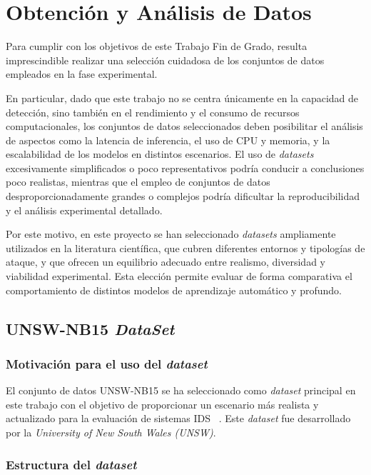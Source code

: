 \chapter{Obtención y Análisis de Datos}
\label{datasets}

Para cumplir con los objetivos de este Trabajo Fin de Grado, resulta imprescindible realizar una selección cuidadosa de los conjuntos de datos empleados en la fase experimental.

En particular, dado que este trabajo no se centra únicamente en la capacidad de detección, sino también en el rendimiento y el consumo de recursos computacionales, los conjuntos de datos seleccionados deben posibilitar el análisis de aspectos como la latencia de inferencia, el uso de CPU y memoria, y la escalabilidad de los modelos en distintos escenarios. El uso de \textit{datasets} excesivamente simplificados o poco representativos podría conducir a conclusiones poco realistas, mientras que el empleo de conjuntos de datos desproporcionadamente grandes o complejos podría dificultar la reproducibilidad y el análisis experimental detallado.

Por este motivo, en este proyecto se han seleccionado \textit{datasets} ampliamente utilizados en la literatura científica, que cubren diferentes entornos y tipologías de ataque, y que ofrecen un equilibrio adecuado entre realismo, diversidad y viabilidad experimental. Esta elección permite evaluar de forma comparativa el comportamiento de distintos modelos de aprendizaje automático y profundo.


\section{UNSW-NB15 \textit{DataSet}}

\subsection{Motivación para el uso del \textit{dataset}}

El conjunto de datos UNSW-NB15 se ha seleccionado como \textit{dataset} principal en este trabajo con el objetivo de proporcionar un escenario más realista y actualizado para la evaluación de sistemas IDS ~\cite{unsw-nb15}. Este \textit{dataset} fue desarrollado por la \emph{University of New South Wales (UNSW)}.

\subsection{Estructura del \textit{dataset}}

